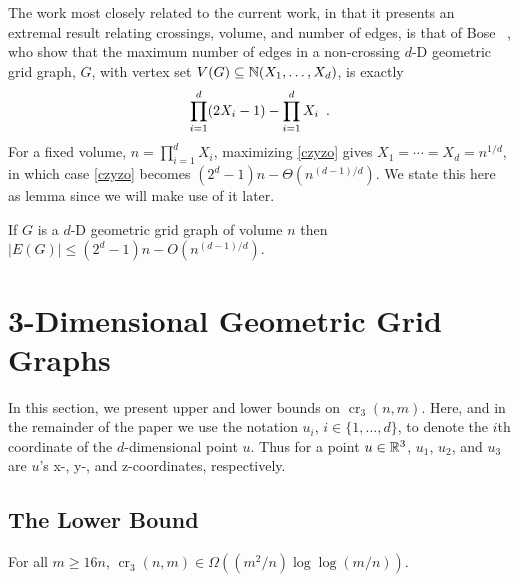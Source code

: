 \documentclass{patmorin}
\DeclareMathOperator{\crs}{cr}
\begin{document}
The work most closely related to the current work, in that it presents
an extremal result relating crossings, volume, and number of edges, is
that of Bose \etal~\cite{bose.czyzowicz.ea:maximum}, who show that the
maximum number of edges in a non-crossing $d$-D geometric grid graph,
$G$, with vertex set $V(G)\subseteq \mathbb{N}(X_1,\ldots,X_d)$, is exactly
\begin{equation}
    \prod_{i=1}^d (2X_i-1) - \prod_{i=1}^d X_i \enspace . \eqlabel{czyzo}
\end{equation}
For a fixed volume, $n=\prod_{i=1}^d X_i$, maximizing \eqref{czyzo}
gives $X_1=\cdots=X_d=n^{1/d}$, in which case \eqref{czyzo} becomes
$(2^d-1)n - \Theta(n^{(d-1)/d})$.  We state this here as lemma since we
will make use of it later.
\begin{lem}
  If $G$ is a $d$-D geometric grid graph of volume $n$
  then $|E(G)|\le(2^d-1)n - O(n^{(d-1)/d})$.
\end{lem}


\section{3-Dimensional Geometric Grid Graphs}

In this section, we present upper and lower bounds on $\crs_3(n,m)$.
Here, and in the remainder of the paper we use the notation
$u_i$, $i\in\{1,\ldots,d\}$, to denote the $i$th coordinate of the
$d$-dimensional point $u$.  Thus for a point $u\in\mathbb{R}^3$, $u_1$, $u_2$,
and $u_3$ are $u$'s x-, y-, and z-coordinates, respectively.

\subsection{The Lower Bound}

\begin{thm}
  For all $m\ge 16n$, $\crs_3(n,m) \in \Omega((m^2/n)\log\log (m/n))$.
\end{thm}
\end{document}

